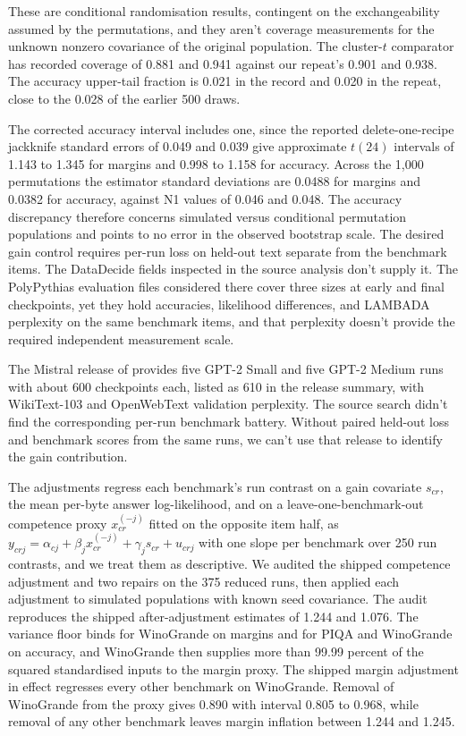 These are conditional randomisation results, contingent on the exchangeability assumed by the permutations, and they aren't coverage measurements for the unknown nonzero covariance of the original population. The cluster-$t$ comparator has recorded coverage of 0.881 and 0.941 against our repeat's 0.901 and 0.938. The accuracy upper-tail fraction is 0.021 in the record and 0.020 in the repeat, close to the 0.028 of the earlier 500 draws.

The corrected accuracy interval includes one, since the reported delete-one-recipe jackknife standard errors of 0.049 and 0.039 give approximate $t(24)$ intervals of 1.143 to 1.345 for margins and 0.998 to 1.158 for accuracy. Across the 1,000 permutations the estimator standard deviations are 0.0488 for margins and 0.0382 for accuracy, against N1 values of 0.046 and 0.048. The accuracy discrepancy therefore concerns simulated versus conditional permutation populations and points to no error in the observed bootstrap scale.
The desired gain control requires per-run loss on held-out text separate from the benchmark items. The DataDecide fields inspected in the source analysis don't supply it. The PolyPythias evaluation files considered there cover three sizes at early and final checkpoints, yet they hold accuracies, likelihood differences, and LAMBADA perplexity on the same benchmark items, and that perplexity doesn't provide the required independent measurement scale.

The Mistral release of \citet{karamcheti2021} provides five GPT-2 Small and five GPT-2 Medium runs with about 600 checkpoints each, listed as 610 in the release summary, with WikiText-103 and OpenWebText validation perplexity. The source search didn't find the corresponding per-run benchmark battery. Without paired held-out loss and benchmark scores from the same runs, we can't use that release to identify the gain contribution.

\label{app:proxy}
The adjustments regress each benchmark's run contrast on a gain covariate $s_{cr}$, the mean per-byte answer log-likelihood, and on a leave-one-benchmark-out competence proxy $x_{cr}^{(-j)}$ fitted on the opposite item half, as $y_{crj}=\alpha_{cj}+\beta_jx_{cr}^{(-j)}+\gamma_js_{cr}+u_{crj}$ with one slope per benchmark over 250 run contrasts, and we treat them as descriptive. We audited the shipped competence adjustment and two repairs on the 375 reduced runs, then applied each adjustment to simulated populations with known seed covariance. The audit reproduces the shipped after-adjustment estimates of 1.244 and 1.076. The variance floor binds for WinoGrande on margins and for PIQA and WinoGrande on accuracy, and WinoGrande then supplies more than 99.99 percent of the squared standardised inputs to the margin proxy. The shipped margin adjustment in effect regresses every other benchmark on WinoGrande. Removal of WinoGrande from the proxy gives 0.890 with interval 0.805 to 0.968, while removal of any other benchmark leaves margin inflation between 1.244 and 1.245.

